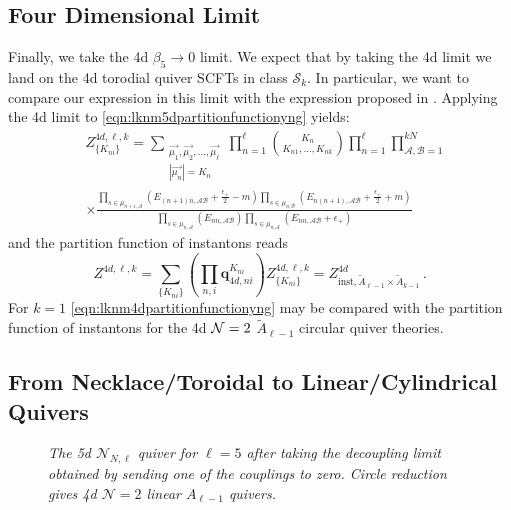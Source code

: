 \documentclass[main.tex]{subfiles}
\begin{document}
\subsection{Four Dimensional Limit}
Finally, we take the 4d $\beta_5\to0$ limit. We expect that by taking the 4d limit we land on the 4d torodial quiver SCFTs in class $\mathcal{S}_k$. In particular, we want to compare our expression in this limit with the expression proposed in \cite{Mitev:2017jqj}. Applying the 4d limit to \eqref{eqn:lknm5dpartitionfunctionyng} yields:
\begin{equation}\label{eqn:lknm4dpartitionfunctionyng}
\begin{aligned}
&Z^{4d,\ell,k}_{\{K_{ni}\}}=\sum_{\substack{\vec{\mu_1},\vec{\mu_2},\dots,\vec{\mu_{\ell}}\\|\vec{\mu_n}|=K_n}}\prod_{n=1}^{\ell}\binom{K_n}{K_{n1},\dots,K_{nk}}\prod_{n=1}^{\ell}\prod_{\mathcal{A},\mathcal{B}=1}^{kN}\\
&\times\frac{\prod_{s\in \mu_{n+1,\mathcal{A}}}\left(E_{(n+1)n,\mathcal{A}\mathcal{B}}+\frac{\epsilon_+}{2}-m\right)\prod_{s\in \mu_{n,\mathcal{B}}}\left(E_{n(n+1),\mathcal{A}\mathcal{B}}+\frac{\epsilon_+}{2}+m\right)}{\prod_{s\in \mu_{n,\mathcal{A}}}\left(E_{nn,\mathcal{A}\mathcal{B}}\right)\prod_{s\in \mu_{n,\mathcal{A}}}\left(E_{nn,\mathcal{A}\mathcal{B}}+\epsilon_+\right)}
\end{aligned}
\end{equation}
and the partition function of instantons reads
\begin{equation}
Z^{4d,\ell,k}=\sum_{\{K_{ni}\}}\left(\prod_{n,i}\mathbf{q}_{4d,ni}^{K_{ni}}\right)Z^{4d,\ell,k}_{\{K_{ni}\}}=Z^{4d}_{\text{inst},\tilde{A}_{\ell-1}\times \tilde{A}_{k-1}}\,.
\end{equation}
For $k=1$ \eqref{eqn:lknm4dpartitionfunctionyng} may be compared with the partition function of instantons for the 4d $\mathcal{N}=2$ $\tilde{A}_{\ell-1}$ circular quiver theories.


\subsection{From Necklace/Toroidal to Linear/Cylindrical Quivers}

\begin{figure}
\centering
{}
\caption{\it The 5d $\mathcal{N}_{N,\ell}$ quiver for $\ell=5$ after taking the decoupling limit obtained by sending one of the couplings to zero. Circle reduction gives 4d $\mathcal{N}=2$ linear $A_{\ell-1}$ quivers.}
\label{fig:5dNNldecoup}
\end{figure}
\end{document}
